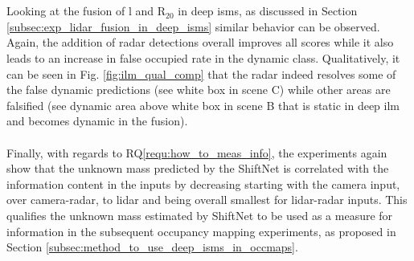 \\\\
Looking at the fusion of \gls{l} and R$_{20}$ in deep \gls{ism}s, as discussed in Section \ref{subsec:exp_lidar_fusion_in_deep_isms} similar behavior can be observed. Again, the addition of radar detections overall improves all scores while it also leads to an increase in false occupied rate in the dynamic class. Qualitatively, it can be seen in Fig. \ref{fig:ilm_qual_comp} that the radar indeed resolves some of the false dynamic predictions (see white box in scene C) while other areas are falsified (see dynamic area above white box in scene B that is static in deep \gls{ilm} and becomes dynamic in the fusion).
\\\\
Finally, with regards to RQ\ref{requ:how_to_meas_info}, the experiments again show that the unknown mass predicted by the ShiftNet is correlated with the information content in the inputs by decreasing starting with the camera input, over camera-radar, to lidar and being overall smallest for lidar-radar inputs. This qualifies the unknown mass estimated by ShiftNet to be used as a measure for information in the subsequent occupancy mapping experiments, as proposed in Section \ref{subsec:method_to_use_deep_isms_in_occmaps}.